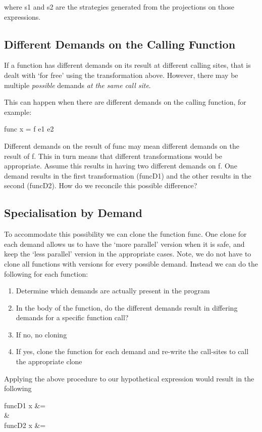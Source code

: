 where \<s1\> and \<s2\> are the strategies generated from the projections on those
expressions.


\subsection*{Different Demands on the Calling Function}

If a function has different demands on its result at different calling sites,
that is dealt with `for free' using the transformation above. However, there
may be multiple \emph{possible} demands \emph{at the same call site}.

This can happen when there are different demands on the calling function, for
example:

\begin{haskell}
        func x = f e1 e2
\end{haskell}

Different demands on the result of \<func\> may mean different demands on
the result of \<f\>. This in turn means that different transformations would
be appropriate. Assume this results in having two different demands on
\<f\>. One demand results in the first transformation (\<funcD1\>) and
the other results in the second (\<funcD2\>). How do we reconcile this
possible difference?

\subsection*{Specialisation by Demand}

To accommodate this possibility we can clone the function \<func\>. One
clone for each demand allows us to have the `more parallel' version when it
is safe, and keep the `less parallel' version in the appropriate cases. Note,
we do not have to clone all functions with versions for every possible demand.
Instead we can do the following for each function:

\begin{enumerate}
    \item Determine which demands are actually present in the program
    \item In the body of the function, do the different demands result in differing
        demands for a specific function call?
    \item If no, no cloning
    \item If yes, clone the function for each demand and re-write the call-sites to call
        the appropriate clone
\end{enumerate}

Applying the above procedure to our hypothetical expression would result in the
following


\begin{haskell}
funcD1 x &=  \\
\quad&\quad\\
funcD2 x &= 
\end{haskell}
